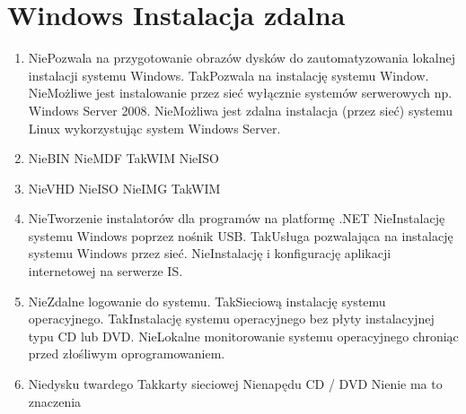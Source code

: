 
\newpage
\section{Windows Instalacja zdalna}
	\begin{enumerate}
		\item {}%
		{Nie}{Pozwala na przygotowanie obrazów dysków do zautomatyzowania lokalnej instalacji systemu Windows.}%
		{Tak}{Pozwala na instalację systemu Window.}%
		{Nie}{Możliwe jest instalowanie przez sieć wyłącznie systemów serwerowych np. Windows Server 2008.}%
		{Nie}{Możliwa jest zdalna instalacja (przez sieć) systemu Linux wykorzystując system Windows Server.}
		\item {}%
		{Nie}{BIN}%
		{Nie}{MDF}%
		{Tak}{WIM}%
		{Nie}{ISO}
		\item {}%
		{Nie}{VHD}%
		{Nie}{ISO}%
		{Nie}{IMG}%
		{Tak}{WIM}
		\item {}%
		{Nie}{Tworzenie instalatorów dla programów na platformę .NET}%
		{Nie}{Instalację systemu Windows poprzez nośnik USB.}%
		{Tak}{Usługa pozwalająca na instalację systemu Windows przez sieć.}%
		{Nie}{Instalację i konfigurację aplikacji internetowej na serwerze IS.}
		\item {}%
		{Nie}{Zdalne logowanie do systemu.}%
		{Tak}{Sieciową instalację systemu operacyjnego.}%
		{Tak}{Instalację systemu operacyjnego bez płyty instalacyjnej typu CD lub DVD.}%
		{Nie}{Lokalne monitorowanie systemu operacyjnego chroniąc przed złośliwym oprogramowaniem.}
		\item {}%
		{Nie}{dysku twardego}%
		{Tak}{karty sieciowej}%
		{Nie}{napędu CD / DVD}%
		{Nie}{nie ma to znaczenia}
		

\end{enumerate}
